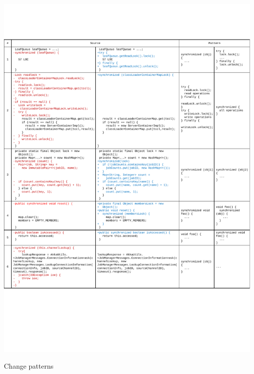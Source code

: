 \begin{table}
	\centering
	\includegraphics[width=1\textwidth]{patterns}
	\caption{Change patterns}
	\label{table:patterns}
\end{table}
